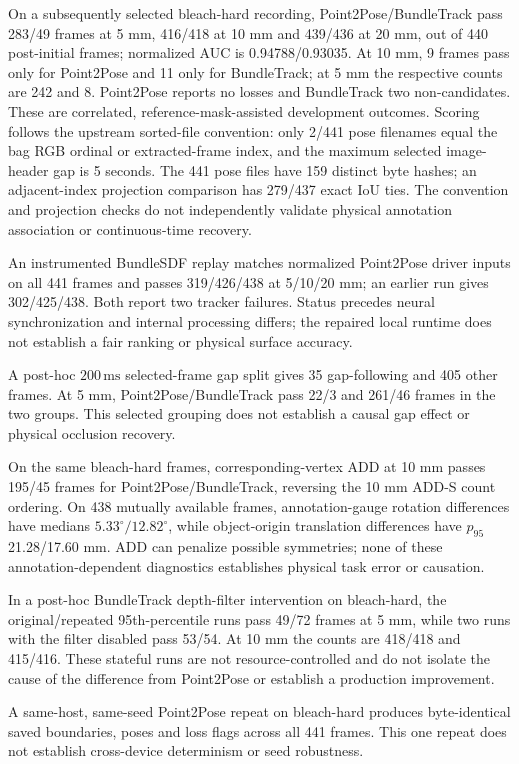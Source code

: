 \documentclass[10pt,journal]{IEEEtran}
\begin{document}
On a subsequently selected bleach-hard recording, Point2Pose/BundleTrack pass 283/49 frames at 5 mm, 416/418 at 10 mm and 439/436 at 20 mm, out of 440 post-initial frames; normalized AUC is 0.94788/0.93035. At 10 mm, 9 frames pass only for Point2Pose and 11 only for BundleTrack; at 5 mm the respective counts are 242 and 8. Point2Pose reports no losses and BundleTrack two non-candidates. These are correlated, reference-mask-assisted development outcomes. Scoring follows the upstream sorted-file convention: only 2/441 pose filenames equal the bag RGB ordinal or extracted-frame index, and the maximum selected image-header gap is 5 seconds. The 441 pose files have 159 distinct byte hashes; an adjacent-index projection comparison has 279/437 exact IoU ties. The convention and projection checks do not independently validate physical annotation association or continuous-time recovery.

An instrumented BundleSDF replay matches normalized Point2Pose driver inputs on all 441 frames and passes 319/426/438 at 5/10/20 mm; an earlier run gives 302/425/438. Both report two tracker failures. Status precedes neural synchronization and internal processing differs; the repaired local runtime does not establish a fair ranking or physical surface accuracy.

A post-hoc $200\,\mathrm{ms}$ selected-frame gap split gives 35 gap-following and 405 other frames. At 5 mm, Point2Pose/BundleTrack pass 22/3 and 261/46 frames in the two groups. This selected grouping does not establish a causal gap effect or physical occlusion recovery.

On the same bleach-hard frames, corresponding-vertex ADD at 10 mm passes 195/45 frames for Point2Pose/BundleTrack, reversing the 10 mm ADD-S count ordering. On 438 mutually available frames, annotation-gauge rotation differences have medians $5.33^\circ/12.82^\circ$, while object-origin translation differences have $p_{95}$ 21.28/17.60 mm. ADD can penalize possible symmetries; none of these annotation-dependent diagnostics establishes physical task error or causation.

In a post-hoc BundleTrack depth-filter intervention on bleach-hard, the original/repeated 95th-percentile runs pass 49/72 frames at 5 mm, while two runs with the filter disabled pass 53/54. At 10 mm the counts are 418/418 and 415/416. These stateful runs are not resource-controlled and do not isolate the cause of the difference from Point2Pose or establish a production improvement.

A same-host, same-seed Point2Pose repeat on bleach-hard produces byte-identical saved boundaries, poses and loss flags across all 441 frames. This one repeat does not establish cross-device determinism or seed robustness.
\end{document}
